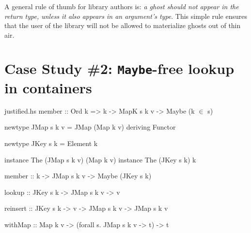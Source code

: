 \documentclass[format=sigplan, review=false, screen=true]{acmart}
\begin{document}
A general rule of thumb for library authors is:
\emph{a ghost should not appear in the return type,  unless it also appears in an argument's type}. This simple rule ensures that
the user of the library will not be allowed to materialize ghosts out of thin air.

\section{Case Study \#2: \texttt{Maybe}-free lookup in containers}

\begin{filecontents*}{justified.hs}
member :: Ord k => k -> MapK s k v -> Maybe (k {$\in$} s)

newtype JMap s k v = JMap (Map k v)
    deriving Functor

newtype JKey s k = Element k

instance The (JMap s k v) (Map k v)
instance The (JKey s k)  k

member ::  k -> JMap s k v -> Maybe (JKey s k)

lookup   :: JKey s k -> JMap s k v -> v

reinsert
  :: JKey s k -> v -> JMap s k v -> JMap s k v

withMap
:: Map k v  -> (forall s. JMap s k v -> t) -> t
\end{filecontents*}


\begin{figure*}
  \begin{minipage}{0.48\textwidth}
    \inputminted{haskell}{justified.hs}
  \end{minipage}
  \begin{minipage}{0.48\textwidth}
    \inputminted{haskell}{justified-usage.hs}
  \end{minipage}
\end{figure*}
\end{document}
